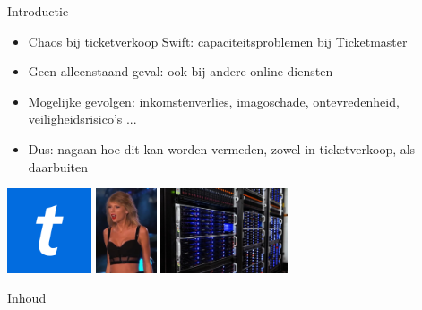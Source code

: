 \documentclass{beamer}
\begin{document}
\begin{frame}{Introductie}
    \begin{itemize}
        \item Chaos bij ticketverkoop Swift: capaciteitsproblemen bij Ticketmaster
        \item Geen alleenstaand geval: ook bij andere online diensten
        \item Mogelijke gevolgen: inkomstenverlies, imagoschade, ontevredenheid,
        veiligheidsrisico's ...
        \item Dus: nagaan hoe dit kan worden vermeden, zowel in
        ticketverkoop, als daarbuiten
    \end{itemize}
    \begin{center}
        \includegraphics[height = 2.5cm]{ticketmaster-logo.png}
        \includegraphics[height = 2.5cm]{taylor-swift.png}
        \includegraphics[height = 2.5cm]{server-rack.jpg}
    \end{center}
\end{frame}


\begin{frame}{Inhoud}
  \tableofcontents
\end{frame}
\end{document}
